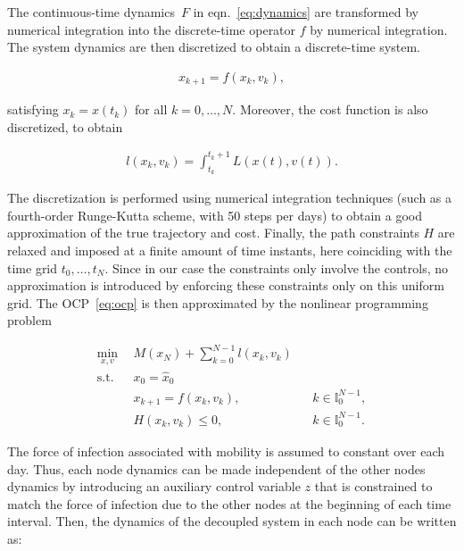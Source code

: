 The continuous-time dynamics~$F$ in eqn.~\eqref{eq:dynamics} are transformed by numerical integration into the discrete-time operator $f$ by numerical integration. The system dynamics are then discretized to obtain a discrete-time system.

\begin{align*}
    x_{k+1} = f(x_k,v_k),
\end{align*}

satisfying $x_k=x(t_k)$ for all $k=0,\ldots,N$. Moreover, the cost function is also discretized, to obtain

\begin{align*}
    l(x_k,v_k)=\int_{t_k}^{t_k+1} L(x(t),v(t)).
\end{align*}

The discretization is performed using numerical integration techniques (such as a fourth-order Runge-Kutta scheme, with 50 steps per days) to obtain a good approximation of the true trajectory and cost. Finally, the path constraints $H$ are relaxed and imposed at a finite amount of time instants, here coinciding with the time grid $t_0,\ldots,t_N$. Since in our case the constraints only involve the controls, no approximation is introduced by enforcing these constraints only on this uniform grid. The OCP~\eqref{eq:ocp} is then approximated by the nonlinear programming problem

\begin{subequations}
    \begin{align}
        \min_{x,v} \ \ & M(x_N)+\sum_{k=0}^{N-1} l(x_k,v_k)  \\ 
        \mathrm{s.t.} \ \ & x_0 = \hat x_0 \\
        & x_{k+1} = f(x_k,v_k), && k\in \mathbb{I}_0^{N-1}, \\
        &H(x_k,v_k)\leq 0, && k\in \mathbb{I}_0^{N-1}.
    \end{align}
        \label{eq:ocp_nlp}
\end{subequations}

The force of infection associated with mobility is assumed to constant over each day. Thus, each node dynamics can be made independent of the other nodes dynamics by introducing an auxiliary control variable $z$ that is constrained to match the force of infection due to the other nodes at the beginning of each time interval. Then, the dynamics of the decoupled system in each node can be written as:


